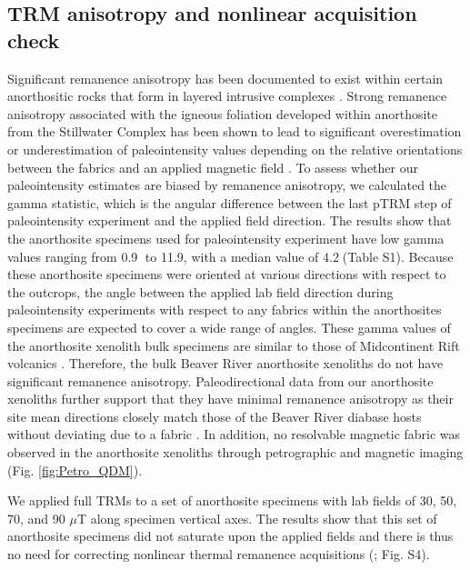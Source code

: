 \documentclass[9pt,twocolumn,twoside,lineno]{pnas-new}
\begin{document}
\subsection*{TRM anisotropy and nonlinear acquisition check}
Significant remanence anisotropy has been documented to exist within certain anorthositic rocks that form in layered intrusive complexes \cite{Selkin2000a, Feinberg2006a}. Strong remanence anisotropy associated with the igneous foliation developed within anorthosite from the Stillwater Complex has been shown to lead to significant overestimation or underestimation of paleointensity values depending on the relative orientations between the fabrics and an applied magnetic field \cite{Selkin2000a}. To assess whether our paleointensity estimates are biased by remanence anisotropy, we calculated the gamma statistic, which is the angular difference between the last pTRM step of paleointensity experiment and the applied field direction. The results show that the anorthosite specimens used for paleointensity experiment have low gamma values ranging from 0.9\textdegree$\;$ to 11.9\textdegree, with a median value of 4.2\textdegree$\;$(Table S1). Because these anorthosite specimens were oriented at various directions with respect to the outcrops, the angle between the applied lab field direction during paleointensity experiments with respect to any fabrics within the anorthosites specimens are expected to cover a wide range of angles. These gamma values of the anorthosite xenolith bulk specimens are similar to those of Midcontinent Rift volcanics \cite{Sprain2018a}. Therefore, the bulk Beaver River anorthosite xenoliths do not have significant remanence anisotropy. Paleodirectional data from our anorthosite xenoliths further support that they have minimal remanence anisotropy as their site mean directions closely match those of the Beaver River diabase hosts without deviating due to a fabric \cite{Zhang2021b}. In addition, no resolvable magnetic fabric was observed in the anorthosite xenoliths through petrographic and magnetic imaging (Fig. \ref{fig:Petro_QDM}). 

We applied full TRMs to a set of anorthosite specimens with lab fields of 30, 50, 70, and 90 $\mu$T along specimen vertical axes. The results show that this set of anorthosite specimens did not saturate upon the applied fields and there is thus no need for correcting nonlinear thermal remanence acquisitions (\citealp{Selkin2007a}; Fig. S4). 
\end{document}

